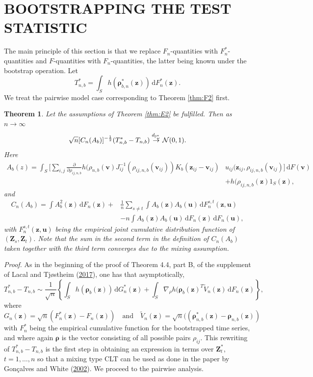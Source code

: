 \documentclass[
  12pt,
  letterpaper]{article}
\newtheorem{thm}{Theorem}[section]
\numberwithin{equation}{section}
\newcommand{\Z}{\bm{Z}}
\newcommand{\z}{\bm{z}}
\newcommand{\fv}{\bm{v}}
\newcommand{\fu}{\bm{u}}
\newcommand{\frho}{\bm{\rho}}
\newcommand{\di}{\,\textrm{d}}
\begin{document}
\hypertarget{bootstrapping-the-test-statistic}{%
\section{BOOTSTRAPPING THE TEST STATISTIC}\label{bootstrapping-the-test-statistic}}

The main principle of this section is that we replace \(F_n\)-quantities with \(F_n^{*}\)-quantities and \(F\)-quantities with \(F_n\)-quantities, the latter being known under the bootstrap operation. Let
\[T_{n,b}^* = \int_S h(\frho_{b,n}^*(\z))\di F_n^*(\z).\]
We treat the pairwise model case corresponding to Theorem \ref{thm:F2} first.

\begin{thm}
Let the assumptions of Theorem \ref{thm:E2} be fulfilled. Then
as $n \to \infty$
$$
\sqrt{n}[C_{n}(A_b)]^{-\frac{1}{2}}(T_{n,b}^* - T_{n,b}) \stackrel{d_{\mathbb{P}_{\omega}^{*}}}{\to} {\cal N}(0,1).
$$
Here 
\begin{align*}
A_b(z) = \int_{S} \Big[\sum_{i,j}\frac{\partial}{\partial \rho_{ij,n,b}} h(\rho_{n,b}(\fv)J_{ij}^{-1}(\rho_{ij,n,b}(\fv_{ij}))K_b(\z_{ij}-\fv_{ij})&u_{ij}(\z_{ij},\rho_{ij,n,b}(\fv_{ij})\Big]  \di F(\fv) \\
& + h(\rho_{ij,n,b}(\z)1_S(\z),
\end{align*}
and 
\begin{align}
C_n(A_b) = \int A_b^2(\z)\di F_n(\z) + & \frac{1}{n}\sum_{s \neq t}\int A_b(\z)A_b(\fu)\di F^{s,t}_{n}(\z,\fu) \nonumber \\
& -  n\int A_b(\z)A_b(\fu) \di F_n(\z) \di F_n(\fu), 
\label{eq:t00}
\end{align}
with $F^{s,t}_{n}(\z,\fu)$ being the empirical joint cumulative distribution function of $(\Z_s,\Z_t)$. Note that the sum in the second term in the definition of $C_n(A_b)$ taken together with the third term converges due to the mixing assumption.
\label{thm:H1}
\end{thm}

\emph{Proof.} As in the beginning of the proof of Theorem 4.4, part B, of the supplement of Lacal and Tjøstheim (\protect\hyperlink{ref-lacal2017local}{2017}), one has that asymptotically,
\begin{equation}
T_{n,b}^* - T_{n,b}  \sim \frac{1}{\sqrt{n}} \left\{\int_S h(\frho_b(\z)) \di G_n^*(\z) + \int_S\nabla_{\rho}h(\frho_b(\z)^{T}\tilde{V}_n(\z) \di F_n(\z)\right\},
\label{eq:t11}
\end{equation}
where
\[
G_n(\z) = \sqrt{n}(F_n^*(\z) - F_n(\z)) \quad \mbox{and} \quad \tilde{V}_n(\z) = \sqrt{n}((\frho_{n,b}^{*}(\z) -\frho_{n,b}(\z))
\]
with \(F_n^*\) being the empirical cumulative function for the bootstrapped time series, and where again \(\frho\) is the vector consisting of all possible pairs \(\rho_{ij}\). This rewriting of \(T_{n,b}^*-T_{n,b}\) is the first step in obtaining an expression in terms over \(\Z^*_t\), \(t=1,\dots,n\) so that a mixing type CLT can be used as done in the paper by Gonçalves and White (\protect\hyperlink{ref-gonccalves2002bootstrap}{2002}). We proceed to the pairwise analysis.
\end{document}
